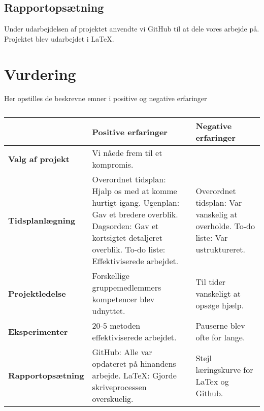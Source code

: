 \subsection{Rapportopsætning}
Under udarbejdelsen af projektet anvendte vi GitHub til at dele vores arbejde på. Projektet blev udarbejdet i LaTeX. 

\section{Vurdering}
Her opstilles de beskrevne emner i positive og negative erfaringer


\begin{table}[h]
	\caption{}
	\begin{tabular}{|l|p{5cm}|p{5cm}|}
		\hline
		&\textbf{Positive erfaringer}&\textbf{Negative erfaringer}\\ \hline
		\textbf{Valg af projekt}  & Vi nåede frem til et kompromis.& \\ \hline  
		\textbf{Tidsplanlægning}  & Overordnet tidsplan: Hjalp os med at komme hurtigt igang.\newline
		Ugenplan: Gav et bredere overblik.\newline
		Dagsorden: Gav et kortsigtet detaljeret overblik.\newline
		To-do liste: Effektiviserede arbejdet. & Overordnet tidsplan: Var vanskelig at overholde. \newline 
		To-do liste: Var ustruktureret. \\ \hline
		\textbf{Projektledelse}   & Forskellige gruppemedlemmers kompetencer blev udnyttet. & Til tider vanskeligt at opsøge hjælp. \\ \hline
		\textbf{Eksperimenter}    & $20$-$5$ metoden effektiviserede arbejdet. & Pauserne blev ofte for lange. \\ \hline
		\textbf{Rapportopsætning} & GitHub: Alle var opdateret på hinandens arbejde.\newline
		LaTeX: Gjorde skriveprocessen overskuelig. & Stejl læringskurve for LaTex og Github.\\ \hline
     
	\end{tabular}
\end{table}



